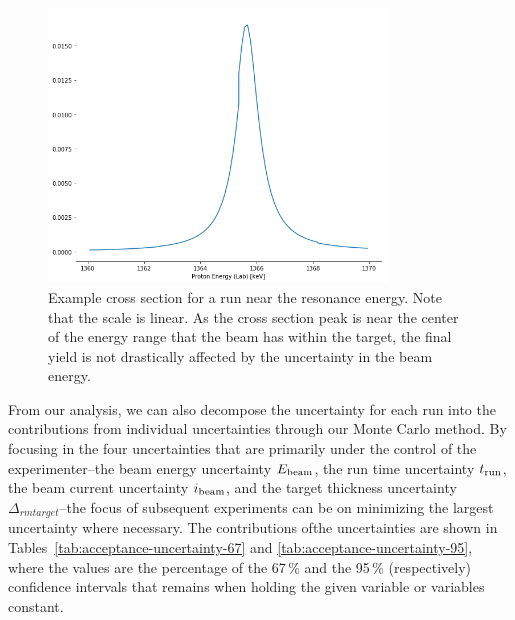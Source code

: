 \begin{figure}
    \begin{center}
        \label{fig:example-cross-section}
        \centerline{
            \includegraphics[width=0.8\textwidth]{figures/xs_example.png}}
        \caption[Example cross section]{Example cross section for a run
            near the resonance energy. Note that the scale is linear. As
            the cross section peak is near the center of the energy range
            that the beam has within the target, the final yield is not
            drastically affected by the uncertainty in the beam energy.}
    \end{center}
\end{figure}

From our analysis, we can also decompose the uncertainty for each run
into the contributions from individual uncertainties through our Monte
Carlo method. By focusing in the four uncertainties that are primarily
under the control of the experimenter\---{}the beam energy uncertainty
$E_{\rm beam}$, the run time uncertainty $t_{\rm run}$, the beam current
uncertainty $i_{\rm beam}$, and the target thickness uncertainty
$\Delta_{rm target}$\---{}the focus of subsequent experiments can be on
minimizing the largest uncertainty where necessary. The contributions
ofthe uncertainties are shown in
Tables~\ref{tab:acceptance-uncertainty-67} and
\ref{tab:acceptance-uncertainty-95}, where the values are the percentage
of the 67\,\% and the 95\,\% (respectively) confidence intervals that
remains when holding the given variable or variables constant.

